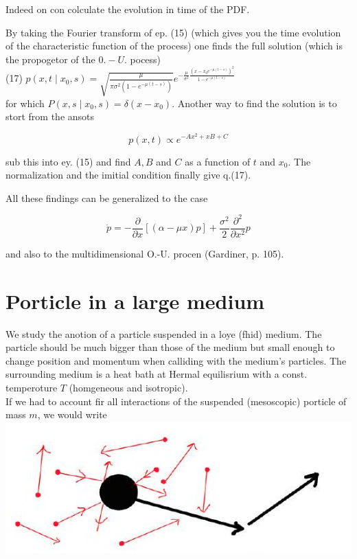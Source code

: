 \documentclass[10pt]{article}
\begin{document}
Indeed on con colculate the evolution in time of the PDF.

By taking the Fourier transform of ep. (15) (which gives you the time evolution of the characteristic function of the process) one finds the full solution (which is the propogetor of the $0 .-U$. pocess)\\
(17) $p\left(x, t \mid x_{0}, s\right)=\sqrt{\frac{\mu}{\pi \sigma^{2}\left(1-e^{-\mu(t-s)}\right)}} e^{-\frac{\mu}{\sigma^{2}} \frac{\left(x-x_{0} e^{-\mu(t-s)}\right)^{2}}{1-e^{-\mu(t-s)}}}$\\
for which $P\left(x, s \mid x_{0}, s\right)=\delta\left(x-x_{0}\right)$. Another way to find the solution is to stort from the ansots

$$
p(x, t) \propto e^{-A x^{2}+x B+C}
$$

sub this into ey. (15) and find $A, B$ and $C$ as a function of $t$ and $x_{0}$. The normalization and the imitial condition finally give q.(17).

All these findings can be generalized to the case

$$
\dot{p}=-\frac{\partial}{\partial x}[(\alpha-\mu x) p]+\frac{\sigma^{2}}{2} \frac{\partial^{2}}{\partial x^{2}} p
$$

and also to the multidimensional O.-U. procen (Gardiner, p. 105).

\section*{Porticle in a large medium}
We study the anotion of a particle suspended in a loye (fhid) medium. The particle should be much bigger than those of the medium but small enough to change position and momentum when calliding with the medium's particles. The surrounding medium is a heat bath at Hermal equilisrium with a const. temperoture $T$ (homgeneous and isotropic).\\
If we had to account fir all interactions of the suspended (mesoscopic) porticle of mass $m$, we would write\\
\includegraphics[max width=\textwidth, center]{2025_10_17_1e406b49946272086d2dg-10}
\end{document}
